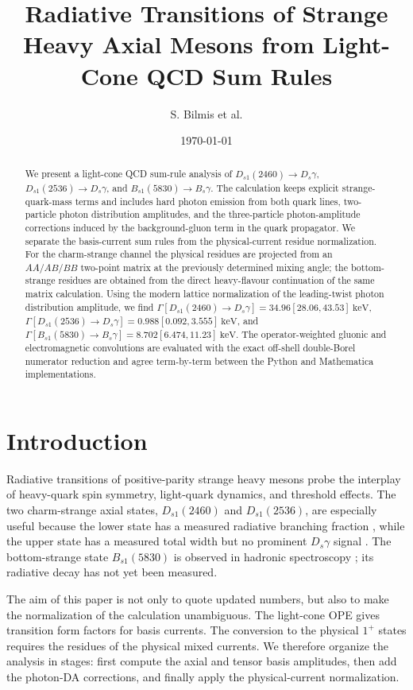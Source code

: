 \documentclass[11pt]{article}
\title{Radiative Transitions of Strange Heavy Axial Mesons from Light-Cone QCD Sum Rules}
\author{S. Bilmis et al.}
\date{\today}
\newcommand{\Ds}{D_s}
\newcommand{\Dsone}{D_{s1}}
\newcommand{\Bs}{B_s}
\newcommand{\Bsone}{B_{s1}}
\newcommand{\keV}{\mathrm{keV}}
\begin{document}
\maketitle

\begin{abstract}
We present a light-cone QCD sum-rule analysis of
$\Dsone(2460)\to\Ds\gamma$, $\Dsone(2536)\to\Ds\gamma$, and
$\Bsone(5830)\to\Bs\gamma$.  The calculation keeps explicit strange-quark-mass
terms and includes hard photon emission from both quark lines, two-particle
photon distribution amplitudes, and the three-particle photon-amplitude
corrections induced by the background-gluon term in the quark propagator.  We
separate the basis-current sum rules from the physical-current residue
normalization.  For the charm-strange channel the physical residues are
projected from an $AA/AB/BB$ two-point matrix at the previously determined
mixing angle; the bottom-strange residues are obtained from the direct
heavy-flavour continuation of the same matrix calculation.  Using the modern
lattice normalization of the
leading-twist photon distribution amplitude, we find
$\Gamma[\Dsone(2460)\to\Ds\gamma]=34.96[28.06,43.53]~\keV$,
$\Gamma[\Dsone(2536)\to\Ds\gamma]=0.988[0.092,3.555]~\keV$, and
$\Gamma[\Bsone(5830)\to\Bs\gamma]=8.702[6.474,11.23]~\keV$.
The operator-weighted gluonic and electromagnetic convolutions are evaluated
with the exact off-shell double-Borel numerator reduction and agree
term-by-term between the Python and Mathematica implementations.
\end{abstract}

\section{Introduction}

Radiative transitions of positive-parity strange heavy mesons probe the
interplay of heavy-quark spin symmetry, light-quark dynamics, and threshold
effects.  The two charm-strange axial states, $\Dsone(2460)$ and
$\Dsone(2536)$, are especially useful because the lower state has a measured
radiative branching fraction \cite{BaBar2006}, while the upper state has a
measured total width but no prominent $\Ds\gamma$ signal \cite{BaBar2011}.  The
bottom-strange state $\Bsone(5830)$ is observed in hadronic spectroscopy
\cite{CMS2018}; its radiative decay has not yet been measured.

The aim of this paper is not only to quote updated numbers, but also to make the
normalization of the calculation unambiguous.  The light-cone OPE gives
transition form factors for basis currents.  The conversion to the physical
$1^+$ states requires the residues of the physical mixed currents.  We therefore
organize the analysis in stages: first compute the axial and tensor basis
amplitudes, then add the photon-DA corrections, and finally apply the
physical-current normalization.
\end{document}
